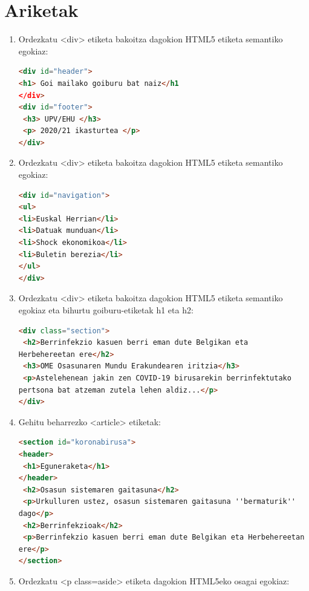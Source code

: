 \section{Ariketak}

\begin{enumerate}

\item Ordezkatu <div> etiketa bakoitza dagokion HTML5 etiketa semantiko egokiaz:
 
 \begin{lstlisting}[language=HTML,numbers=none]
 <div id="header">
<h1> Goi mailako goiburu bat naiz</h1
</div>
<div id="footer">
 <h3> UPV/EHU </h3>
 <p> 2020/21 ikasturtea </p>
</div>
 \end{lstlisting}
 
 
\item Ordezkatu <div> etiketa bakoitza dagokion HTML5 etiketa semantiko egokiaz:

 \begin{lstlisting}[language=HTML,numbers=none]
 <div id="navigation">
<ul>
<li>Euskal Herrian</li>
<li>Datuak munduan</li>
<li>Shock ekonomikoa</li>
<li>Buletin berezia</li>
</ul>
</div>
  \end{lstlisting}
 
 \item Ordezkatu <div> etiketa bakoitza dagokion HTML5 etiketa semantiko egokiaz eta bihurtu goiburu-etiketak h1 eta h2:

\begin{lstlisting}[language=HTML,numbers=none]
<div class="section">
 <h2>Berrinfekzio kasuen berri eman dute Belgikan eta
Herbehereetan ere</h2>
 <h3>OME Osasunaren Mundu Erakundearen iritzia</h3>
 <p>Astelehenean jakin zen COVID-19 birusarekin berrinfektutako
pertsona bat atzeman zutela lehen aldiz...</p>
</div>
 \end{lstlisting}
 
 \item Gehitu beharrezko <article> etiketak:
 \begin{lstlisting}[language=HTML,numbers=none]
 <section id="koronabirusa">
<header>
 <h1>Eguneraketa</h1>
</header>
 <h2>Osasun sistemaren gaitasuna</h2>
 <p>Urkulluren ustez, osasun sistemaren gaitasuna ''bermaturik''
dago</p>
 <h2>Berrinfekzioak</h2>
 <p>Berrinfekzio kasuen berri eman dute Belgikan eta Herbehereetan
ere</p>
</section>
\end{lstlisting}

\item Ordezkatu <p class=\textquotedbl{}aside\textquotedbl{}> etiketa dagokion HTML5eko osagai egokiaz:


\end{enumerate}
